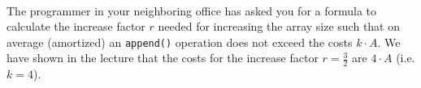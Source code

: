 \\
The programmer in your neighboring office has asked you for a formula to
calculate the increase factor $r$ needed for increasing the array size such
that on average (amortized) an \texttt{append()} operation does not exceed the
costs $k \cdot A$.
We have shown in the lecture that the costs for the increase factor
$r = \frac{3}{2}$ are $4 \cdot A$ (i.e. $k = 4$).